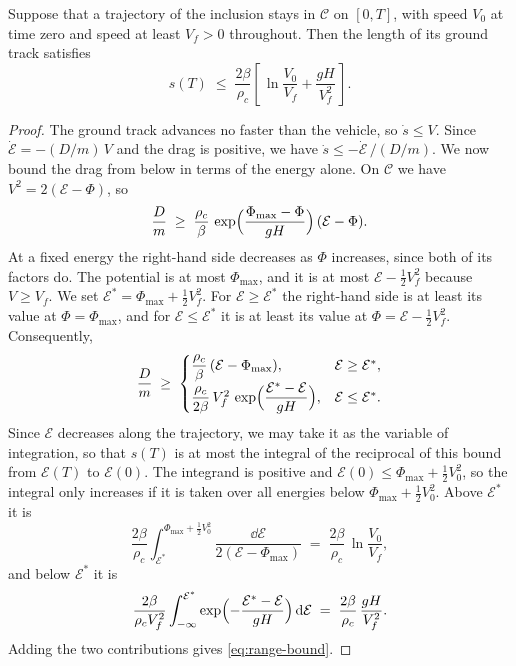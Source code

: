 \documentclass[english,11pt]{extarticle}
\begin{document}
\begin{prop}\label{prop:range-bound}
Suppose that a trajectory of the inclusion stays in $\mathcal{C}$ on
$[0,T]$, with speed $V_0$ at time zero and speed at least $V_f > 0$
throughout. Then the length of its ground track satisfies
\begin{equation}\label{eq:range-bound}
  s(T) \;\le\; \frac{2\beta}{\rho_c}
  \left[\,\ln\frac{V_0}{V_f} + \frac{g H}{V_f^{2}}\,\right].
\end{equation}
\end{prop}

\begin{proof}
The ground track advances no faster than the vehicle, so $\dot s \le V$.
Since $\dot{\mathcal{E}} = -(D/m)\,V$ and the drag is positive, we have
$\dot s \le -\dot{\mathcal{E}}\,/(D/m)$. We now bound the drag from below in
terms of the energy alone. On $\mathcal{C}$ we have
$V^2 = 2(\mathcal{E}-\Phi)$, so
\[
  \frac{D}{m} \;\ge\; \frac{\rho_c}{\beta}\,
  \exp\Bigl(\frac{\Phi_{\max}-\Phi}{g H}\Bigr)\,(\mathcal{E}-\Phi) .
\]
At a fixed energy the right-hand side decreases as $\Phi$ increases, since
both of its factors do. The potential is at most $\Phi_{\max}$, and it is at
most $\mathcal{E}-\tfrac12 V_f^2$ because $V \ge V_f$. We set
$\mathcal{E}^* = \Phi_{\max} + \tfrac12 V_f^2$. For
$\mathcal{E}\ge\mathcal{E}^*$ the right-hand side is at least its value at
$\Phi = \Phi_{\max}$, and for $\mathcal{E}\le\mathcal{E}^*$ it is at least
its value at $\Phi = \mathcal{E}-\tfrac12 V_f^2$. Consequently,
\[
  \frac{D}{m} \;\ge\;
  \begin{cases}
    \dfrac{\rho_c}{\beta}\,(\mathcal{E}-\Phi_{\max}),
      & \mathcal{E}\ge\mathcal{E}^*, \\[1.2ex]
    \dfrac{\rho_c}{2\beta}\,V_f^2\,
      \exp\Bigl(\dfrac{\mathcal{E}^*-\mathcal{E}}{g H}\Bigr),
      & \mathcal{E}\le\mathcal{E}^* .
  \end{cases}
\]
Since $\mathcal{E}$ decreases along the trajectory, we may take it as the
variable of integration, so that $s(T)$ is at most the integral of the
reciprocal of this bound from $\mathcal{E}(T)$ to $\mathcal{E}(0)$. The
integrand is positive and
$\mathcal{E}(0) \le \Phi_{\max} + \tfrac12 V_0^2$, so the integral only
increases if it is taken over all energies below
$\Phi_{\max} + \tfrac12 V_0^2$. Above $\mathcal{E}^*$ it is
\[
  \frac{2\beta}{\rho_c}
  \int_{\mathcal{E}^*}^{\Phi_{\max}+\frac12 V_0^2}
  \frac{\dd\mathcal{E}}{2(\mathcal{E}-\Phi_{\max})}
  \;=\; \frac{2\beta}{\rho_c}\,\ln\frac{V_0}{V_f},
\]
and below $\mathcal{E}^*$ it is
\[
  \frac{2\beta}{\rho_c V_f^2}
  \int_{-\infty}^{\mathcal{E}^*}
  \exp\Bigl(-\frac{\mathcal{E}^*-\mathcal{E}}{g H}\Bigr)\,\mathrm{d}\mathcal{E}
  \;=\; \frac{2\beta}{\rho_c}\,\frac{g H}{V_f^2}.
\]
Adding the two contributions gives \cref{eq:range-bound}.
\end{proof}
\end{document}
